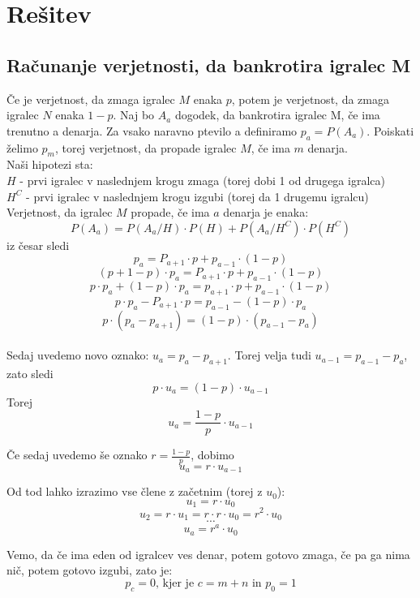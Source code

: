\documentclass[12pt, a4paper]{article}
\begin{document}
\newpage

\section[Rešitev]{Rešitev}
\subsection{Računanje verjetnosti, da bankrotira igralec M}

Če je verjetnost, da zmaga igralec $M$ enaka $p$, potem je verjetnost, da zmaga igralec $N$ enaka $1-p$. Naj bo $A_a$ dogodek, da bankrotira igralec M, če ima trenutno a denarja. Za vsako naravno ptevilo a definiramo $p_a = P(A_a)$.
Poiskati želimo $p_m$, torej verjetnost, da propade igralec $M$, če ima $m$ denarja. 
\\

Naši hipotezi sta:
\\
$H$ - prvi igralec v naslednjem krogu zmaga (torej dobi 1 od drugega igralca)
\\
$H^C$ - prvi igralec v naslednjem krogu izgubi (torej da 1 drugemu igralcu)
\\

Verjetnost, da igralec $M$ propade, če ima $a$ denarja je enaka:
\\
$$P(A_a) = P(A_a / H) \cdot P(H) + P(A_a / H^C) \cdot P(H^C)$$ iz česar sledi
$$p_a = P_{a+1} \cdot p + p_{a-1} \cdot (1 - p) $$
$$(p + 1 -p) \cdot p_a = P_{a+1} \cdot p + p_{a-1} \cdot (1 - p) $$
$$ p \cdot p_a + (1 - p) \cdot p_a = p_{a+1} \cdot p + p_{a-1} \cdot (1 - p) $$
$$p \cdot p_a - P_{a+1} \cdot p = p_{a-1} - (1-p) \cdot p_a$$
$$p \cdot (p_a - p_{a+1}) = (1-p) \cdot (p_{a-1} - p_a)$$
\\

Sedaj uvedemo novo oznako: $u_a = p_a - p_{a+1}$. Torej velja tudi $u_{a-1} = p_{a-1} - p_a$, zato sledi
$$p \cdot u_a = (1 - p) \cdot u_{a-1}$$
Torej $$u_a = \frac{1-p}{p} \cdot u_{a-1}$$

Če sedaj uvedemo še oznako $r=\frac{1-p}{p}$, dobimo
$$u_a = r \cdot u_{a-1}$$

Od tod lahko izrazimo vse člene z začetnim (torej z $u_0$):
$$u_1 = r \cdot u_0$$
$$u_2 = r \cdot u_1 = r \cdot r \cdot u_0 = r^2 \cdot u_0$$ 
$$\cdots $$
$$u_a = r^a \cdot u_0$$


Vemo, da če ima eden od igralcev ves denar, potem gotovo zmaga, če pa ga nima nič, potem gotovo izgubi, zato je:
$$p_c = 0 \textrm{, kjer je } c = m + n \textrm{ in } p_0 = 1$$
\end{document}
